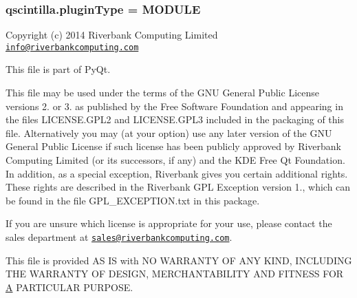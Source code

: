 \subsubsection[{plugin\+Type}]{\setlength{\rightskip}{0pt plus 5cm}qscintilla.\+plugin\+Type = M\+O\+D\+U\+L\+E}\label{namespaceqscintilla_ae8d3c2a6be1ff6ca678ee71ba3a6f6a0}


Copyright (c) 2014 Riverbank Computing Limited \href{mailto:info@riverbankcomputing.com}{\tt info@riverbankcomputing.\+com} 

This file is part of Py\+Qt.

This file may be used under the terms of the G\+N\+U General Public License versions 2. or 3. as published by the Free Software Foundation and appearing in the files L\+I\+C\+E\+N\+S\+E.\+G\+P\+L2 and L\+I\+C\+E\+N\+S\+E.\+G\+P\+L3 included in the packaging of this file. Alternatively you may (at your option) use any later version of the G\+N\+U General Public License if such license has been publicly approved by Riverbank Computing Limited (or its successors, if any) and the K\+D\+E Free Qt Foundation. In addition, as a special exception, Riverbank gives you certain additional rights. These rights are described in the Riverbank G\+P\+L Exception version 1., which can be found in the file G\+P\+L\+\_\+\+E\+X\+C\+E\+P\+T\+I\+O\+N.\+txt in this package.

If you are unsure which license is appropriate for your use, please contact the sales department at \href{mailto:sales@riverbankcomputing.com}{\tt sales@riverbankcomputing.\+com}.

This file is provided A\+S I\+S with N\+O W\+A\+R\+R\+A\+N\+T\+Y O\+F A\+N\+Y K\+I\+N\+D, I\+N\+C\+L\+U\+D\+I\+N\+G T\+H\+E W\+A\+R\+R\+A\+N\+T\+Y O\+F D\+E\+S\+I\+G\+N, M\+E\+R\+C\+H\+A\+N\+T\+A\+B\+I\+L\+I\+T\+Y A\+N\+D F\+I\+T\+N\+E\+S\+S F\+O\+R \hyperlink{classA}{A} P\+A\+R\+T\+I\+C\+U\+L\+A\+R P\+U\+R\+P\+O\+S\+E. 